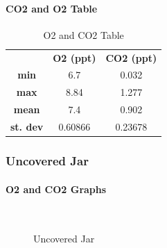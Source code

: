 \documentclass[a4paper, 12pt, english]{article}
\begin{document}
\paragraph{CO2 and O2 Table}
\begin{table}[H]
	\caption{\label{tab:Table 2} O2 and CO2 Table}
	\centering
	\begin{tabular}{c c c}
		\toprule
		                 & \textbf{O2 (ppt)}
		                 & \textbf{CO2 (ppt)}           \\
		\cmidrule[0.4pt](r{0.125em}){1-1}%
		\cmidrule[0.4pt](lr{0.125em}){2-2}%
		\cmidrule[0.4pt](lr{0.125em}){3-3}%
		\textbf{min}     & 6.7                & 0.032   \\
		\textbf{max}     & 8.84               & 1.277   \\
		\textbf{mean}    & 7.4                & 0.902   \\
		\textbf{st. dev} & 0.60866            & 0.23678
	\end{tabular}
\end{table}

\subsubsection{Uncovered Jar}
\paragraph{O2 and CO2 Graphs}
\begin{figure}[H]
	\centering
	\\
	\qquad
	\qquad
	\caption{Uncovered Jar}
	\label{fig:UncoveredJar}
\end{figure}
\end{document}
